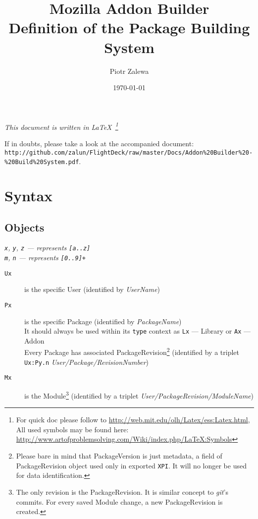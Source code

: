 \documentclass[10pt]{article}
\title{Mozilla Addon Builder\\ Definition of the Package Building System}
\author{Piotr Zalewa}
\date{\today}
\def\xpi{{\tt XPI}}
\begin{document}
\maketitle

\noindent\hfill{\small \em This document is written in \LaTeX\ \footnote{For quick doc please follow to \url{http://web.mit.edu/olh/Latex/ess:Latex.html}, All used symbols may be found here: \url{http://www.artofproblemsolving.com/Wiki/index.php/LaTeX:Symbols}}}

\noindent If in doubts, please take a look at the accompanied document:\\ {\tt http://github.com/zalun/FlightDeck/raw/master/Docs/Addon\%20Builder\%20-\%20Build\%20System.pdf}.

\section{Syntax}

	\subsection{Objects}
	
	{\em \small {\tt x}, {\tt y}, {\tt z} --- represents {\tt [a..z]}\\
	{\tt m}, {\tt n} --- represents {\tt [0..9]+}}
	
	\begin{description}
		\item[{\tt Ux}] is the specific User (identified by {\em UserName})
		\item[{\tt Px}] is the specific Package (identified by {\em PackageName})\\
			It should always be used within its {\tt type} context as {\tt Lx} --- Library or {\tt Ax} --- Addon\\
			Every Package has associated PackageRevision\footnote{Please bare in mind that PackageVersion is just metadata, a field of PackageRevision object used only in exported \xpi. It will no longer be used for data identification.} (identified by a triplet {\tt Ux:Py.n} {\em User/Package/RevisionNumber})
		\item[{\tt Mx}] is the Module\footnote{The only revision is the PackageRevision. It is similar concept to {\em git}'s commits. For every saved Module change, a new PackageRevision is created.} (identified by a triplet {\em User/PackageRevision/ModuleName})
	\end{description}
\end{document}
